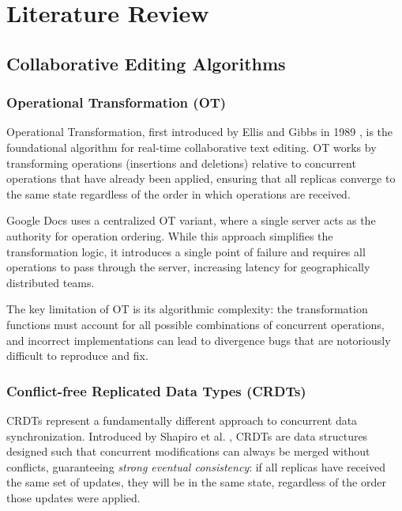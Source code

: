 \documentclass[12pt,a4paper,oneside]{report}
\begin{document}
\chapter{Literature Review}

\section{Collaborative Editing Algorithms}

\subsection{Operational Transformation (OT)}

Operational Transformation, first introduced by Ellis and Gibbs in 1989 \cite{ellis1989}, is the foundational algorithm for real-time collaborative text editing. OT works by transforming operations (insertions and deletions) relative to concurrent operations that have already been applied, ensuring that all replicas converge to the same state regardless of the order in which operations are received.

Google Docs uses a centralized OT variant, where a single server acts as the authority for operation ordering. While this approach simplifies the transformation logic, it introduces a single point of failure and requires all operations to pass through the server, increasing latency for geographically distributed teams.

The key limitation of OT is its algorithmic complexity: the transformation functions must account for all possible combinations of concurrent operations, and incorrect implementations can lead to divergence bugs that are notoriously difficult to reproduce and fix.

\subsection{Conflict-free Replicated Data Types (CRDTs)}

CRDTs represent a fundamentally different approach to concurrent data synchronization. Introduced by Shapiro et al. \cite{shapiro2011}, CRDTs are data structures designed such that concurrent modifications can always be merged without conflicts, guaranteeing \textit{strong eventual consistency}: if all replicas have received the same set of updates, they will be in the same state, regardless of the order those updates were applied.
\end{document}
